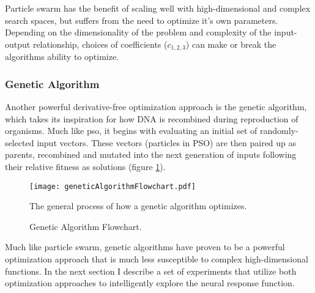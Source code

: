 Particle swarm has the benefit of scaling well with high-dimensional and complex search spaces, but suffers from the need to optimize it's own parameters. Depending on the dimensionality of the problem and complexity of the input-output relationship, choices of coefficients ($c_{1,2,3}$) can make or break the algorithms ability to optimize. 

\subsubsection*{Genetic Algorithm}
Another powerful derivative-free optimization approach is the genetic algorithm, which takes its inspiration for how DNA is recombined during reproduction of organisms. Much like \gls{pso}, it begins with evaluating an initial set of randomly-selected input vectors. These vectors (particles in PSO) are then paired up as parents, recombined and mutated into the next generation of inputs following their relative fitness as solutions (figure \ref{fig:geneticFlowchart}). 

\begin{figure}[h]
	\centering
	\texttt{[image: geneticAlgorithmFlowchart.pdf]} 
	\caption{Genetic Algorithm Flowchart.}{The general process of how a genetic algorithm optimizes.}
	\label{fig:geneticFlowchart}
\end{figure}

Much like particle swarm, genetic algorithms have proven to be a powerful optimization approach that is much less susceptible to complex high-dimensional functions. In the next section I describe a set of experiments that utilize both optimization approaches to intelligently explore the neural response function.

 